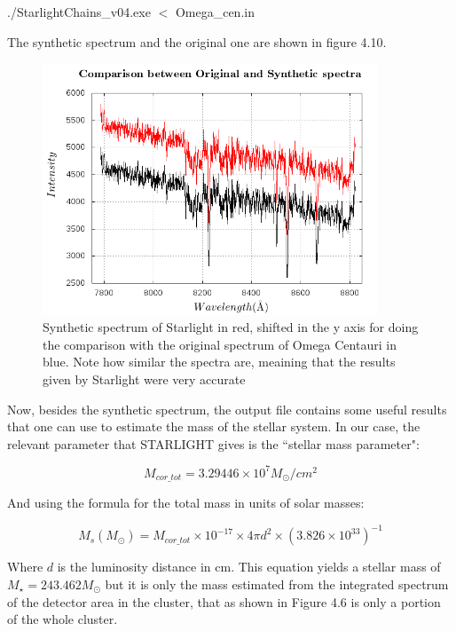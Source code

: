 \begin{center}
./StarlightChains\_v04.exe $<$ Omega\_cen.in
\end{center}

The synthetic spectrum and the original one are shown in figure 4.10.

\begin{figure}[]
\centering
\includegraphics[width=10cm]{images/comparison.png}
\caption[Synthetic spectrum of STARLIGHT]{Synthetic spectrum of Starlight in red, shifted in the y axis for doing the comparison with the original spectrum of Omega Centauri in blue. Note how similar the spectra are, meaining that the results given by Starlight were very accurate}
\end{figure}
 
Now, besides the synthetic spectrum, the output file contains some useful results that one can use to estimate the mass of the stellar system. In our case, the relevant parameter that STARLIGHT gives is the ``stellar mass parameter":

\begin{equation}
M_{cor\_tot} = 3.29446 \times 10^{7} M_{\odot}/cm^{2}
\end{equation}

And using the formula for the total mass in units of solar masses:

\begin{equation}
M_{s}(M_{\odot})=M_{cor\_tot}\times10^{-17}\times4\pi d^{2}\times\left(3.826\times10^{33}\right)^{-1}
\end{equation}

Where $d$ is the luminosity distance in cm. This equation yields a stellar mass of $M_{\star}=243.462M_{\odot}$ but it is only the mass estimated from the integrated spectrum of the detector area in the cluster, that as shown in Figure 4.6 is only a portion of the whole cluster.

